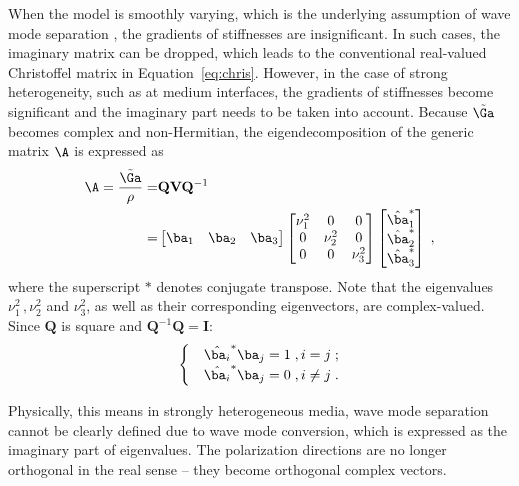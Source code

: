 When the model is smoothly varying, which is the underlying assumption of wave mode separation \cite[]{cheng14}, the gradients of stiffnesses are insignificant. In such cases, the imaginary matrix can be dropped, which leads to the conventional real-valued Christoffel matrix in Equation~\ref{eq:chris}. However, in the case of strong heterogeneity, such as at medium interfaces, the gradients of stiffnesses become significant and the imaginary part needs to be taken into account. Because $\tilde{\Ga}$ becomes complex and non-Hermitian, the eigendecomposition of the generic matrix $\A$ is expressed as
\begin{eqnarray}
\A = \frac{\tilde{\Ga}}{\rho} =& \mathbf{Q} \mathbf{V} \mathbf{Q}^{-1} \\ \nonumber 
=& \begin{bmatrix} \ba_1 & \ba_2 & \ba_3\end{bmatrix} \begin{bmatrix} \nu_1^2 & 0 & 0 \\ 0 & \nu_2^2 & 0 \\ 0 & 0 & \nu_3^2 \end{bmatrix} \begin{bmatrix} \hat{\ba}_1^* \\ \hat{\ba}_2^* \\ \hat{\ba}_3^* \end{bmatrix} \;,
\end{eqnarray}
where the superscript $*$ denotes conjugate transpose. Note that the eigenvalues $\nu_1^2\,,\nu_2^2$ and $\nu_3^2$, as well as their corresponding eigenvectors, are complex-valued. Since $\mathbf{Q}$ is square and $\mathbf{Q}^{-1} \mathbf{Q} = \mathbf{I}$:
\begin{eqnarray}
    \begin{cases}
        & \hat{\ba_i}^* \ba_j = 1 \;, i = j \;; \\ \nonumber
        & \hat{\ba_i}^* \ba_j = 0 \;, i \neq j \;.
    \end{cases}
\end{eqnarray}

Physically, this means in strongly heterogeneous media, wave mode separation cannot be clearly defined due to wave mode conversion, which is expressed as the imaginary part of eigenvalues. The polarization directions are no longer orthogonal in the real sense -- they become orthogonal complex vectors.

